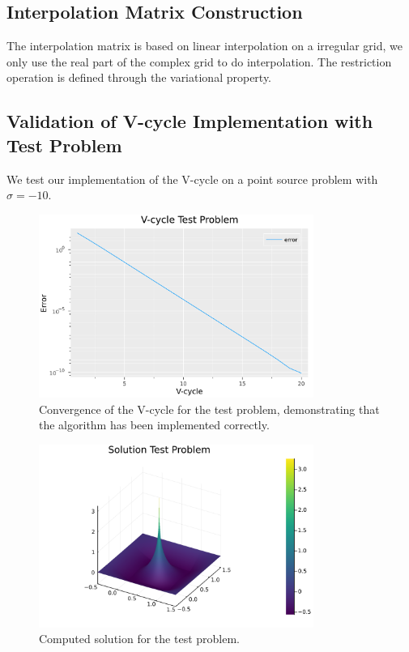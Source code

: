 \documentclass[a4paper,12pt]{article}
\begin{document}
\subsection{Interpolation Matrix Construction}

The interpolation matrix is based on linear interpolation on a irregular grid, we only use
the real part of the complex grid to do interpolation. The restriction operation is defined
through the variational property.

\subsection{Validation of V-cycle Implementation with Test Problem}

We test our implementation of the V-cycle on a point source problem with $\sigma = -10$.

\begin{figure}[h!]
    \centering
    \includegraphics[width=0.8\textwidth]{../plots/Vcycle_Test_Problem.pdf}
    \caption{Convergence of the V-cycle for the test problem, demonstrating that the algorithm has been implemented correctly.}
    \label{fig:../plots/Vcycle_Test_Problem.pdf}
\end{figure}

\begin{figure}[h!]
    \centering
    \includegraphics[width=0.8\textwidth]{../plots/Solution_Test_Problem.png}
    \caption{Computed solution for the test problem.}
    \label{fig:Solution_Test_Problem}
\end{figure}
\end{document}
